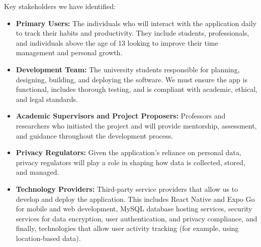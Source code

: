 Key stakeholders we have identified:
\begin{itemize}
    \item \textbf{Primary Users:} The individuals who will interact with the application daily to track their habits and productivity. They include students, professionals, and individuals above the age of 13 looking to improve their time management and personal growth.

    \item \textbf{Development Team:} The university students responsible for planning, designing, building, and deploying the software. We must ensure the app is functional, includes thorough testing, and is compliant with academic, ethical, and legal standards.

    \item \textbf{Academic Supervisors and Project Proposers:} Professors and researchers who initiated the project and will provide mentorship, assessment, and guidance throughout the development process.

    \item \textbf{Privacy Regulators:} Given the application’s reliance on personal data, privacy regulators will play a role in shaping how data is collected, stored, and managed.

    \item \textbf{Technology Providers:} Third-party service providers that allow us to develop and deploy the application. This includes React Native and Expo Go for mobile and web development, MySQL database hosting services, security services for data encryption, user authentication, and privacy compliance, and finally, technologies that allow user activity tracking (for example, using location-based data).
\end{itemize}
